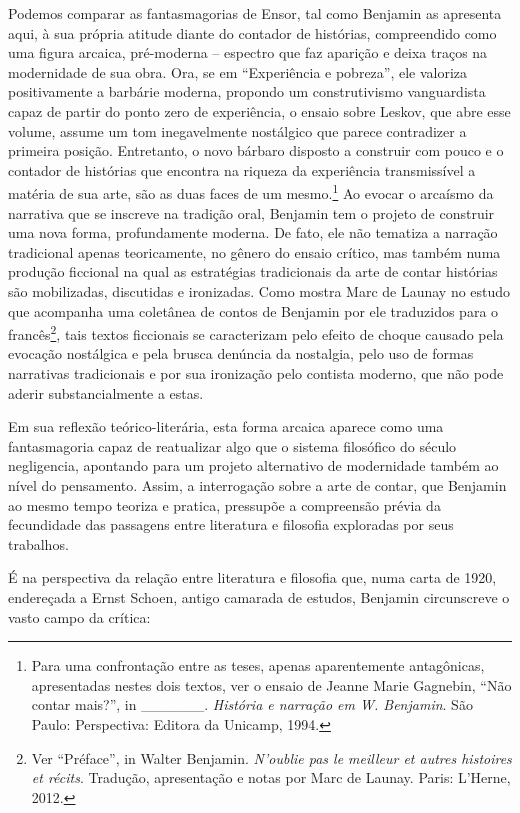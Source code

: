 Podemos comparar as fantasmagorias de Ensor, tal como Benjamin as
apresenta aqui, à sua própria atitude diante do contador de histórias,
compreendido como uma figura arcaica, pré-moderna -- espectro que faz
aparição e deixa traços na modernidade de sua obra. Ora, se em
``Experiência e pobreza'', ele valoriza positivamente a barbárie
moderna, propondo um construtivismo vanguardista capaz de partir do
ponto zero de experiência, o ensaio sobre Leskov, que abre esse volume,
assume um tom inegavelmente nostálgico que parece contradizer a primeira
posição. Entretanto, o novo bárbaro disposto a construir com pouco e o
contador de histórias que encontra na riqueza da experiência
transmissível a matéria de sua arte, são as duas faces de um
mesmo.\footnote{Para uma confrontação entre as teses, apenas
  aparentemente antagônicas, apresentadas nestes dois textos, ver o
  ensaio de Jeanne Marie Gagnebin, ``Não contar mais?'', in
  \_\_\_\_\_\_. \emph{História e narração em W. Benjamin}. São Paulo:
  Perspectiva: Editora da Unicamp, 1994.} Ao evocar o arcaísmo da
narrativa que se inscreve na tradição oral, Benjamin tem o projeto de
construir uma nova forma, profundamente moderna. De fato, ele não
tematiza a narração tradicional apenas teoricamente, no gênero do ensaio
crítico, mas também numa produção ficcional na qual as estratégias
tradicionais da arte de contar histórias são mobilizadas, discutidas e
ironizadas. Como mostra Marc de Launay no estudo que acompanha uma
coletânea de contos de Benjamin por ele traduzidos para o
francês\footnote{Ver ``Préface'', in Walter Benjamin. \emph{N'oublie pas
  le meilleur et autres histoires et récits}. Tradução, apresentação e
  notas por Marc de Launay. Paris: L'Herne, 2012.}, tais textos
ficcionais se caracterizam pelo efeito de choque causado pela evocação
nostálgica e pela brusca denúncia da nostalgia, pelo uso de formas
narrativas tradicionais e por sua ironização pelo contista moderno, que
não pode aderir substancialmente a estas.

Em sua reflexão teórico-literária, esta forma arcaica aparece como uma
fantasmagoria capaz de reatualizar algo que o sistema filosófico do
século  negligencia, apontando para um projeto alternativo de
modernidade também ao nível do pensamento. Assim, a interrogação sobre a
arte de contar, que Benjamin ao mesmo tempo teoriza e pratica, pressupõe
a compreensão prévia da fecundidade das passagens entre literatura e
filosofia exploradas por seus trabalhos.

É na perspectiva da relação entre literatura e filosofia que, numa carta
de 1920, endereçada a Ernst Schoen, antigo camarada de estudos, Benjamin
circunscreve o vasto campo da crítica:

